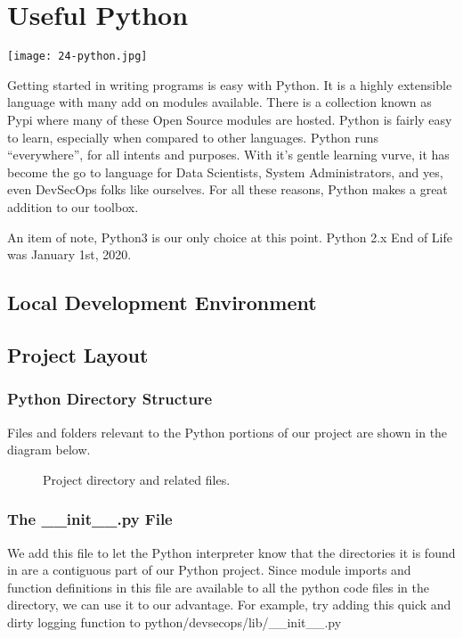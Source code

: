 \chapter{Useful Python}

\texttt{[image: 24-python.jpg]}

\justifying
Getting started in writing programs is easy with Python. It is a highly extensible language with many add on modules available.
There is a collection known as Pypi where many of these Open Source modules are hosted.
Python is fairly easy to learn, especially when compared to other languages. Python runs ``everywhere'', for all intents and
purposes. With it's gentle learning vurve, it has become the go to language for Data Scientists, System Administrators, and yes, even
DevSecOps folks like ourselves. For all these reasons, Python makes a great addition to our toolbox.

\justifying
An item of note, Python3 is our only choice at this point. Python 2.x End of Life was January 1st, 2020.

\section{Local Development Environment}


\section{Project Layout}

\subsection{Python Directory Structure}
\justifying
Files and folders relevant to the Python portions of our project are shown in the diagram below.

\begin{figure}[!htb]
	\centering
	
	\caption{Project directory and related files.}
	\label{pythonfiles}
\end{figure}

\subsection{The \_\_init\_\_.py File}

\justifying
We add this file to let the Python interpreter know that the directories
it is found in are a contiguous part of our Python project. Since module
imports and function definitions in this file are available to all the
python code files in the directory, we can use it to our advantage. For
example, try adding this quick and dirty logging function to
python/devsecops/lib/\_\_init\_\_.py

